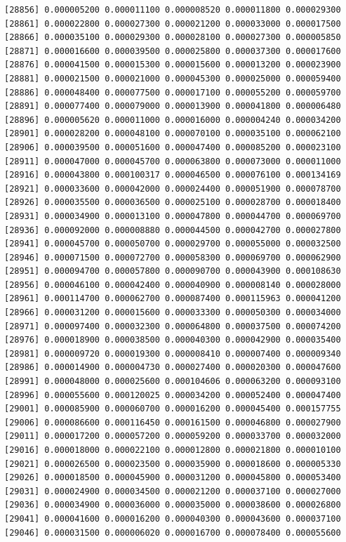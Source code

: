 \documentclass[]{article}
\begin{document}
\begin{verbatim}
[28856] 0.000005200 0.000011100 0.000008520 0.000011800 0.000029300
[28861] 0.000022800 0.000027300 0.000021200 0.000033000 0.000017500
[28866] 0.000035100 0.000029300 0.000028100 0.000027300 0.000005850
[28871] 0.000016600 0.000039500 0.000025800 0.000037300 0.000017600
[28876] 0.000041500 0.000015300 0.000015600 0.000013200 0.000023900
[28881] 0.000021500 0.000021000 0.000045300 0.000025000 0.000059400
[28886] 0.000048400 0.000077500 0.000017100 0.000055200 0.000059700
[28891] 0.000077400 0.000079000 0.000013900 0.000041800 0.000006480
[28896] 0.000005620 0.000011000 0.000016000 0.000004240 0.000034200
[28901] 0.000028200 0.000048100 0.000070100 0.000035100 0.000062100
[28906] 0.000039500 0.000051600 0.000047400 0.000085200 0.000023100
[28911] 0.000047000 0.000045700 0.000063800 0.000073000 0.000011000
[28916] 0.000043800 0.000100317 0.000046500 0.000076100 0.000134169
[28921] 0.000033600 0.000042000 0.000024400 0.000051900 0.000078700
[28926] 0.000035500 0.000036500 0.000025100 0.000028700 0.000018400
[28931] 0.000034900 0.000013100 0.000047800 0.000044700 0.000069700
[28936] 0.000092000 0.000008880 0.000044500 0.000042700 0.000027800
[28941] 0.000045700 0.000050700 0.000029700 0.000055000 0.000032500
[28946] 0.000071500 0.000072700 0.000058300 0.000069700 0.000062900
[28951] 0.000094700 0.000057800 0.000090700 0.000043900 0.000108630
[28956] 0.000046100 0.000042400 0.000040900 0.000008140 0.000028000
[28961] 0.000114700 0.000062700 0.000087400 0.000115963 0.000041200
[28966] 0.000031200 0.000015600 0.000033300 0.000050300 0.000034000
[28971] 0.000097400 0.000032300 0.000064800 0.000037500 0.000074200
[28976] 0.000018900 0.000038500 0.000040300 0.000042900 0.000035400
[28981] 0.000009720 0.000019300 0.000008410 0.000007400 0.000009340
[28986] 0.000014900 0.000004730 0.000027400 0.000020300 0.000047600
[28991] 0.000048000 0.000025600 0.000104606 0.000063200 0.000093100
[28996] 0.000055600 0.000120025 0.000034200 0.000052400 0.000047400
[29001] 0.000085900 0.000060700 0.000016200 0.000045400 0.000157755
[29006] 0.000086600 0.000116450 0.000161500 0.000046800 0.000027900
[29011] 0.000017200 0.000057200 0.000059200 0.000033700 0.000032000
[29016] 0.000018000 0.000022100 0.000012800 0.000021800 0.000010100
[29021] 0.000026500 0.000023500 0.000035900 0.000018600 0.000005330
[29026] 0.000018500 0.000045900 0.000031200 0.000045800 0.000053400
[29031] 0.000024900 0.000034500 0.000021200 0.000037100 0.000027000
[29036] 0.000034900 0.000036000 0.000035000 0.000038600 0.000026800
[29041] 0.000041600 0.000016200 0.000040300 0.000043600 0.000037100
[29046] 0.000031500 0.000006020 0.000016700 0.000078400 0.000055600

\end{verbatim}
\end{document}
